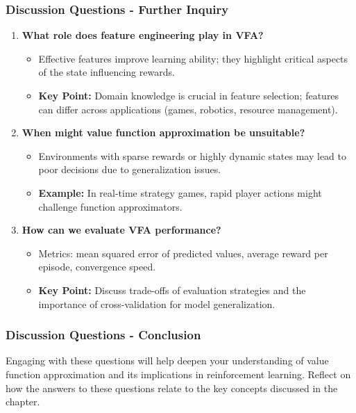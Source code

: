 \documentclass[aspectratio=169]{beamer}
\begin{document}
\begin{frame}[fragile]
    \frametitle{Discussion Questions - Further Inquiry}
    \begin{enumerate}[resume]
        \item \textbf{What role does feature engineering play in VFA?}
        \begin{itemize}
            \item Effective features improve learning ability; they highlight critical aspects of the state influencing rewards.
            \item \textbf{Key Point:} Domain knowledge is crucial in feature selection; features can differ across applications (games, robotics, resource management).
        \end{itemize}
        
        \item \textbf{When might value function approximation be unsuitable?}
        \begin{itemize}
            \item Environments with sparse rewards or highly dynamic states may lead to poor decisions due to generalization issues.
            \item \textbf{Example:} In real-time strategy games, rapid player actions might challenge function approximators.
        \end{itemize}
        
        \item \textbf{How can we evaluate VFA performance?}
        \begin{itemize}
            \item Metrics: mean squared error of predicted values, average reward per episode, convergence speed.
            \item \textbf{Key Point:} Discuss trade-offs of evaluation strategies and the importance of cross-validation for model generalization.
        \end{itemize}
    \end{enumerate}
\end{frame}

\begin{frame}[fragile]
    \frametitle{Discussion Questions - Conclusion}
    Engaging with these questions will help deepen your understanding of value function approximation and its implications in reinforcement learning.
    Reflect on how the answers to these questions relate to the key concepts discussed in the chapter.
\end{frame}
\end{document}
